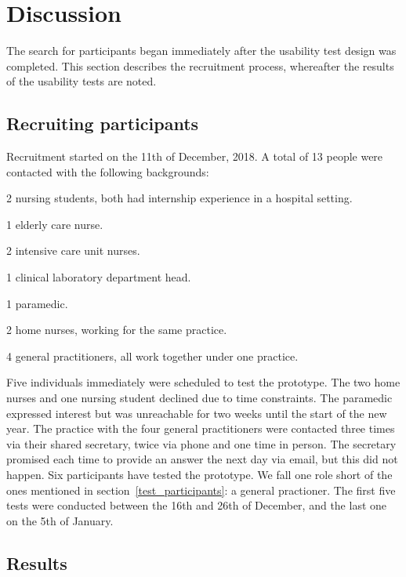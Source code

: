 \section{Discussion}\label{discussion}

The search for participants began immediately after the usability test design was completed. This section describes the recruitment process, whereafter the results of the usability tests are noted.

    \subsection{Recruiting participants}

    Recruitment started on the 11th of December, 2018. A total of 13 people were contacted with the following backgrounds:
    \vspace{-6pt}
    \begin{myitemize}
        \item 2 nursing students, both had internship experience in a hospital setting.
        \item 1 elderly care nurse.
        \item 2 intensive care unit nurses.
        \item 1 clinical laboratory department head.
        \item 1 paramedic.
        \item 2 home nurses, working for the same practice.
        \item 4 general practitioners, all work together under one practice.
    \end{myitemize}

    \noindent Five individuals immediately were scheduled to test the prototype. The two home nurses and one nursing student declined due to time constraints. The paramedic expressed interest but was unreachable for two weeks until the start of the new year. The practice with the four general practitioners were contacted three times via their shared secretary, twice via phone and one time in person. The secretary promised each time to provide an answer the next day via email, but this did not happen. Six participants have tested the prototype. We fall one role short of the ones mentioned in section~\ref{test_participants}: a general practioner. The first five tests were conducted between the 16th and 26th of December, and the last one on the 5th of January.

    \subsection{Results}

